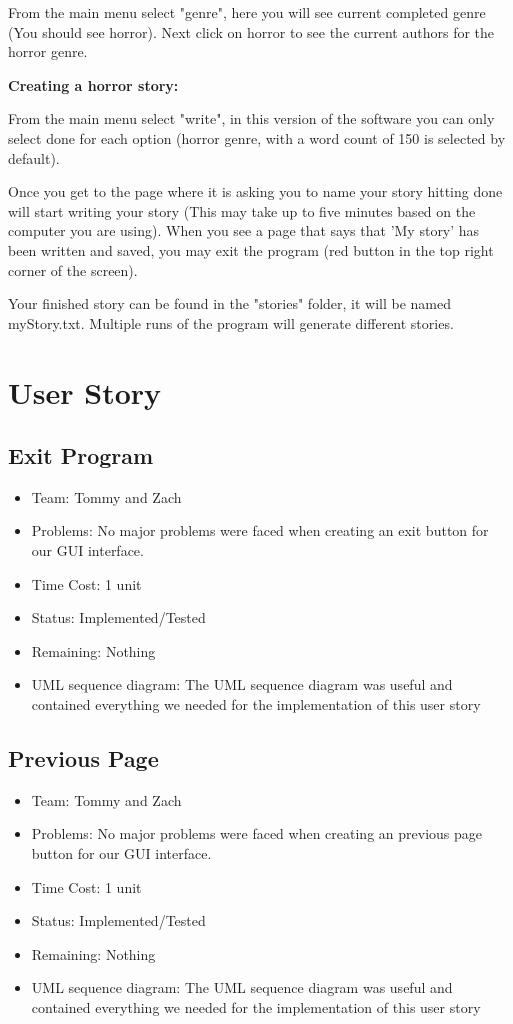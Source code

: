 \documentclass[12pt]{article}
\begin{document}
From the main menu select "genre", here you will see current completed genre (You should see horror).
Next click on horror to see the current authors for the horror genre. 

\textbf{Creating a horror story:}

From the main menu select "write", in this version of the software you can only select done for each option (horror genre, with a word count of 150 is selected by default). 

Once you get to the page where it is asking you to name your story hitting done will start writing your story (This may take up to five minutes based on the computer you are using). 
When you see a page that says that 'My story' has been written and saved, you may exit the program (red button in the top right corner of the screen). 

Your finished story can be found in the "stories" folder, it will be named myStory.txt. Multiple runs of the program will generate different stories.

\section{User Story}

\subsection{Exit Program}
\begin{itemize}
\item Team: Tommy and Zach
\item Problems:  No major problems were faced when creating an exit button for our GUI interface.
\item Time Cost:  1 unit
\item Status: Implemented/Tested
\item Remaining: Nothing
\item UML sequence diagram: The UML sequence diagram was useful and contained everything we needed for the implementation of this user story
\end{itemize}

\subsection{Previous Page}
\begin{itemize}
\item Team: Tommy and Zach
\item Problems:  No major problems were faced when creating an previous page button for our GUI interface.
\item Time Cost: 1 unit
\item Status: Implemented/Tested
\item Remaining: Nothing
\item UML sequence diagram: The UML sequence diagram was useful and contained everything we needed for the implementation of this user story
\end{itemize}
\end{document}

